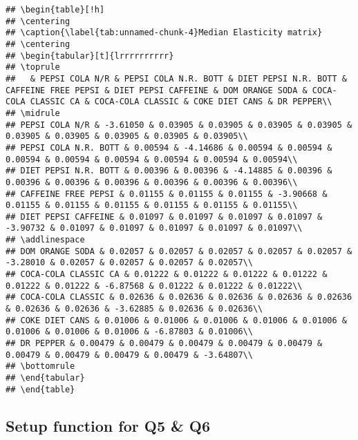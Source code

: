 \documentclass[
]{article}
\begin{document}
\begin{verbatim}
## \begin{table}[!h]
## \centering
## \caption{\label{tab:unnamed-chunk-4}Median Elasticity matrix}
## \centering
## \begin{tabular}[t]{lrrrrrrrrrr}
## \toprule
##   & PEPSI COLA N/R & PEPSI COLA N.R. BOTT & DIET PEPSI N.R. BOTT & CAFFEINE FREE PEPSI & DIET PEPSI CAFFEINE & DOM ORANGE SODA & COCA-COLA CLASSIC CA & COCA-COLA CLASSIC & COKE DIET CANS & DR PEPPER\\
## \midrule
## PEPSI COLA N/R & -3.61050 & 0.03905 & 0.03905 & 0.03905 & 0.03905 & 0.03905 & 0.03905 & 0.03905 & 0.03905 & 0.03905\\
## PEPSI COLA N.R. BOTT & 0.00594 & -4.14686 & 0.00594 & 0.00594 & 0.00594 & 0.00594 & 0.00594 & 0.00594 & 0.00594 & 0.00594\\
## DIET PEPSI N.R. BOTT & 0.00396 & 0.00396 & -4.14885 & 0.00396 & 0.00396 & 0.00396 & 0.00396 & 0.00396 & 0.00396 & 0.00396\\
## CAFFEINE FREE PEPSI & 0.01155 & 0.01155 & 0.01155 & -3.90668 & 0.01155 & 0.01155 & 0.01155 & 0.01155 & 0.01155 & 0.01155\\
## DIET PEPSI CAFFEINE & 0.01097 & 0.01097 & 0.01097 & 0.01097 & -3.90732 & 0.01097 & 0.01097 & 0.01097 & 0.01097 & 0.01097\\
## \addlinespace
## DOM ORANGE SODA & 0.02057 & 0.02057 & 0.02057 & 0.02057 & 0.02057 & -3.28010 & 0.02057 & 0.02057 & 0.02057 & 0.02057\\
## COCA-COLA CLASSIC CA & 0.01222 & 0.01222 & 0.01222 & 0.01222 & 0.01222 & 0.01222 & -6.87568 & 0.01222 & 0.01222 & 0.01222\\
## COCA-COLA CLASSIC & 0.02636 & 0.02636 & 0.02636 & 0.02636 & 0.02636 & 0.02636 & 0.02636 & -3.62885 & 0.02636 & 0.02636\\
## COKE DIET CANS & 0.01006 & 0.01006 & 0.01006 & 0.01006 & 0.01006 & 0.01006 & 0.01006 & 0.01006 & -6.87803 & 0.01006\\
## DR PEPPER & 0.00479 & 0.00479 & 0.00479 & 0.00479 & 0.00479 & 0.00479 & 0.00479 & 0.00479 & 0.00479 & -3.64807\\
## \bottomrule
## \end{tabular}
## \end{table}
\end{verbatim}

\hypertarget{setup-function-for-q5-q6}{%
\subsection{Setup function for Q5 \&
Q6}\label{setup-function-for-q5-q6}}
\end{document}
